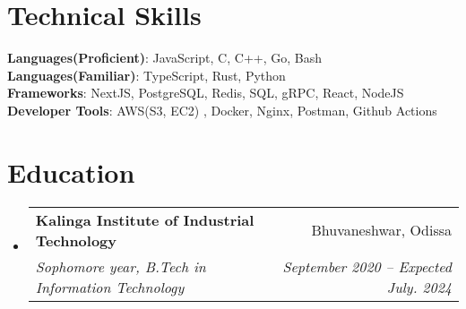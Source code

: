 \documentclass[letterpaper,11pt]{article}
\makeatletter
\newcommand{\resumeSubheading}[4]{
  \vspace{-2pt}\item
    \begin{tabular*}{0.97\textwidth}[t]{l@{\extracolsep{\fill}}r}
      \textbf{#1} & #2 \\
      \textit{\small#3} & \textit{\small #4} \\
    \end{tabular*}\vspace{-7pt}
}
\newcommand{\resumeSubHeadingListStart}{\begin{itemize}[leftmargin=0.15in, label={}]}
\newcommand{\resumeSubHeadingListEnd}{\end{itemize}}
\makeatother
\begin{document}
%
\section{Technical Skills}
 \begin{itemize}[leftmargin=0.15in, label={}]
    \small{\item{
     \textbf{Languages(Proficient)}{: JavaScript, C, C++, Go, Bash } \\
      \textbf{Languages(Familiar)}{: TypeScript, Rust, Python } \\
     \textbf{Frameworks}{: NextJS, PostgreSQL, Redis, SQL, gRPC, React, NodeJS  } \\
     \textbf{Developer Tools}{: AWS(S3, EC2) , Docker, Nginx, Postman, Github Actions } \\
    }}
 \end{itemize}
 
\section{Education}
  \resumeSubHeadingListStart
    \resumeSubheading
      {Kalinga Institute of Industrial Technology}{Bhuvaneshwar, Odissa}
      {Sophomore year, B.Tech in Information Technology}{September 2020 -- Expected July. 2024}
  \resumeSubHeadingListEnd
\end{document}
